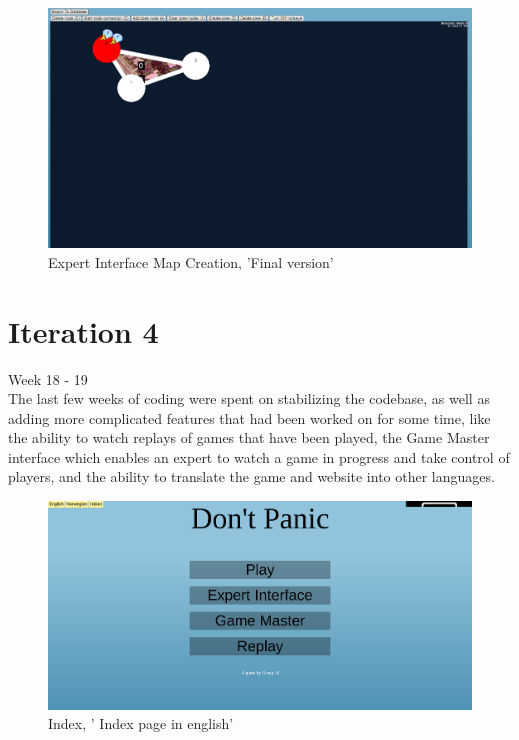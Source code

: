 \begin{figure}[H]
  \centering
    \includegraphics[width=1.0\textwidth]{img/ExpertInterfaceCanvas.png}
  \caption{Expert Interface Map Creation, 'Final version'} 
  \label{fig:EcpertInterfaceCanvas}
\end{figure}

\section{Iteration 4}

Week 18 - 19\\
\newline
The last few weeks of coding were spent on stabilizing the codebase, as well as adding more complicated features that had been worked on for some time, like the ability to watch replays of games that have been played, the Game Master interface which enables an expert to watch a game in progress and take control of players, and the ability to translate the game and website into other languages.\\



\begin{figure}[H]
  \centering
    \includegraphics[width=1.0\textwidth]{img/indexen.png}
  \caption{Index, ' Index page in english'} 
  \label{fig:indexen}
\end{figure}

